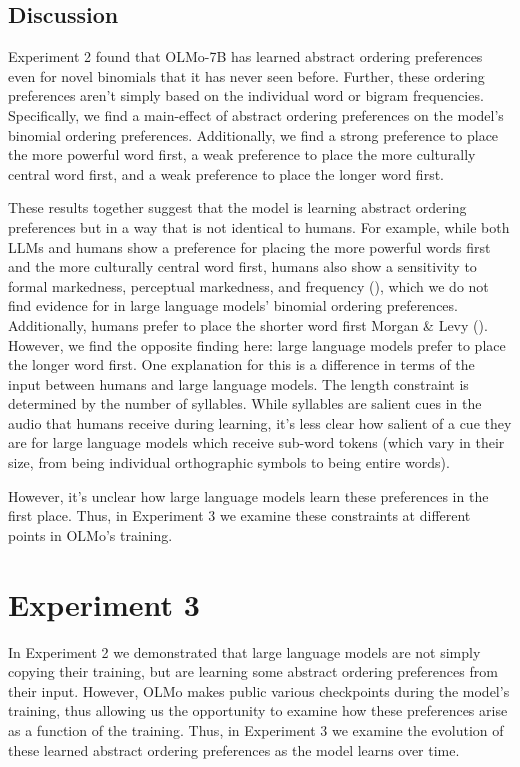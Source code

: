 \documentclass[
  12pt,
  letterpaper,
]{scrreport}
\begin{document}
\subsection{Discussion}\label{discussion-6}

Experiment 2 found that OLMo-7B has learned abstract ordering
preferences even for novel binomials that it has never seen before.
Further, these ordering preferences aren't simply based on the
individual word or bigram frequencies. Specifically, we find a
main-effect of abstract ordering preferences on the model's binomial
ordering preferences. Additionally, we find a strong preference to place
the more powerful word first, a weak preference to place the more
culturally central word first, and a weak preference to place the longer
word first.

These results together suggest that the model is learning abstract
ordering preferences but in a way that is not identical to humans. For
example, while both LLMs and humans show a preference for placing the
more powerful words first and the more culturally central word first,
humans also show a sensitivity to formal markedness, perceptual
markedness, and frequency
(), which we do not find evidence for in large language models'
binomial ordering preferences. Additionally, humans prefer to place the
shorter word first Morgan \& Levy ().
However, we find the opposite finding here: large language models prefer
to place the longer word first. One explanation for this is a difference
in terms of the input between humans and large language models. The
length constraint is determined by the number of syllables. While
syllables are salient cues in the audio that humans receive during
learning, it's less clear how salient of a cue they are for large
language models which receive sub-word tokens (which vary in their size,
from being individual orthographic symbols to being entire words).

However, it's unclear how large language models learn these preferences
in the first place. Thus, in Experiment 3 we examine these constraints
at different points in OLMo's training.

\section{Experiment 3}\label{experiment-3-1}

In Experiment 2 we demonstrated that large language models are not
simply copying their training, but are learning some abstract ordering
preferences from their input. However, OLMo makes public various
checkpoints during the model's training, thus allowing us the
opportunity to examine how these preferences arise as a function of the
training. Thus, in Experiment 3 we examine the evolution of these
learned abstract ordering preferences as the model learns over time.
\end{document}

